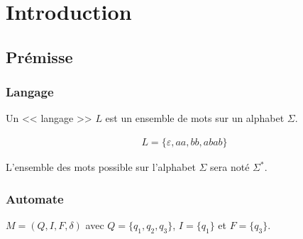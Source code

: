 
\section{Introduction}

\subsection{Prémisse}

\subsubsection{Langage}


\begin{frame}{\myframetitle}
  \begin{definition}[Langage]
    Un << langage >> \(L\) est un ensemble de mots sur un alphabet \(\Sigma\).
  \end{definition}

  \pause[]

  \begin{example}
    \vspace{-1.5\topsep}
    \begin{gather*}
      L = \{\varepsilon, aa, bb, abab\}
    \end{gather*}
  \end{example}

  \pause[]

  \begin{definition}
    L'ensemble des mots possible sur l'alphabet \(\Sigma\) sera noté
    \(\Sigma^*\).
  \end{definition}
\end{frame}

\subsubsection{Automate}


\begin{frame}{\myframetitle}
  \begin{definition}[Automate]
    \(M = (Q, I, F, \delta)\) avec \(Q = \{q_1, q_2, q_3\}\), \(I = \{q_1\}\)
    et \(F = \{q_3\}\).
    \begin{center}
    \end{center}
  \end{definition}
\end{frame}

